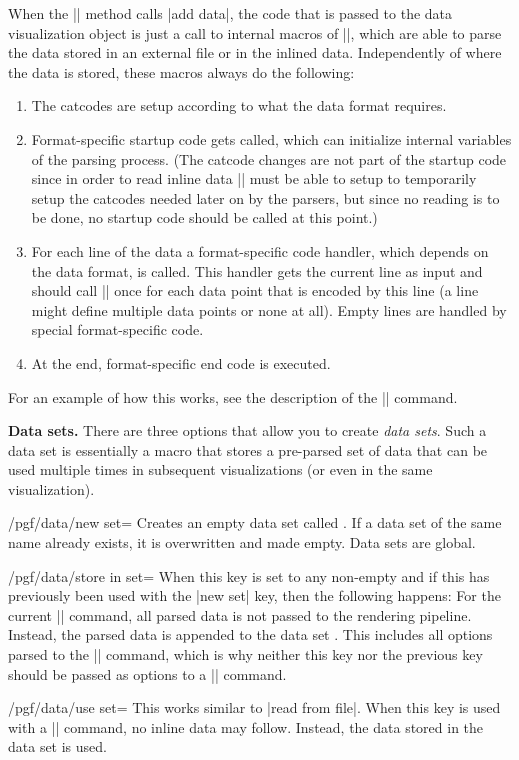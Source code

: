 \begin{command}{\pgfdata{}}
  When the |\pgfdata| method calls |add data|, the code that is passed
  to the data visualization object is just a call to internal macros
  of |\pgfdata|, which are able to parse the data stored in an
  external file or in the inlined data. Independently of where the
  data is stored, these macros always do the following:
  \begin{enumerate}
  \item The catcodes are setup according to what the data
    format requires.
  \item Format-specific startup code gets called, which can initialize
    internal
    variables of the parsing process. (The catcode changes are not
    part of the startup code since in order to read inline data
    |\pgfdata| must be able to setup to temporarily setup the catcodes
    needed later on by the parsers, but since no reading is to be
    done, no startup code should be called at this point.)
  \item For each line of the data a format-specific code handler,
    which depends on the
    data format, is called. This handler gets the current line as
    input and should call |\pgfdatapoint| once for each data point
    that is encoded by this line (a line might define multiple data
    points or none at all). Empty lines are handled by special
    format-specific code.
  \item At the end, format-specific end code is executed.
  \end{enumerate}
  For an example of how this works, see the description of the
  |\pgfdeclaredataformat| command.

  \medskip
  \textbf{Data sets.}
  There are three options that allow you to create \emph{data
    sets}. Such a data set is essentially a macro that stores a
  pre-parsed set of data that can be used multiple times in subsequent
  visualizations (or even in the same visualization).
  \begin{key}{/pgf/data/new set=}
    Creates an empty data set called . If a data set of the
    same name already exists, it is overwritten and made empty. Data
    sets are global.
  \end{key}
  \begin{key}{/pgf/data/store in set=}
    When this key is set to any non-empty  and if this
     has previously been used with the |new set| key, then
    the following happens: For the current |\pgfdata| command, all
    parsed data is not passed to the rendering pipeline. Instead, the
    parsed data is appended to the data set . This includes
    all options parsed to the |\pgfdata| command, which is why neither
    this key nor the previous key should be passed as options to a
    |\pgfdata| command. 
  \end{key}
  \begin{key}{/pgf/data/use set=}
    This works similar to |read from file|. When this key is used with
    a |\pgfdata| command, no inline data may follow. Instead, the data
    stored in the data set  is used.
  \end{key}
\end{command}


